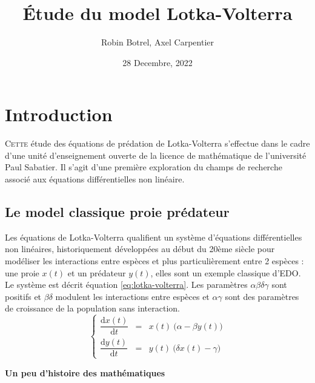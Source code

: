 \documentclass{wsdcr}
\title{Étude du model Lotka-Volterra}
\author{Robin Botrel, Axel Carpentier}
\affil{\textit{Université Paul Sabatier}\\
\textit{Toulouse, France}}
\date{28 Decembre, 2022}
\begin{document}
\maketitle
\tableofcontents
\section{Introduction}

\lettrine{C}{ette} étude des équations de prédation de Lotka-Volterra s'effectue dans le cadre d'une unité d'enseignement ouverte de la licence de mathématique de l'université Paul Sabatier. Il s'agit d'une première exploration du champs de recherche associé aux équations différentielles non linéaire.


\subsection{Le model classique proie prédateur}

Les équations de Lotka-Volterra qualifient un système d'équations différentielles non linéaires, historiquement développées au début du 20ème siècle pour modéliser les interactions entre espèces et plus particulièrement entre 2 espèces : une proie $x(t)$ et un prédateur $y(t)$, elles sont un exemple classique d'EDO. Le système est décrit équation \ref{eq:lotka-volterra}. Les paramètres $\alpha \beta \delta \gamma$ sont positifs et $\beta \delta$ modulent les interactions entre espèces et $\alpha \gamma$ sont des paramètres de croissance de la population sans interaction. \cite{lotka1920}
\begin{equation}
\left\{
{\begin{array}{ccc}{\dfrac {\mathrm {d} x(t)}{\mathrm {d} t}}&=&x(t)\ {\Big (}\alpha -\beta y(t){\Big )}\\{\dfrac {\mathrm {d} y(t)}{\mathrm {d} t}}&=&y(t)\ {\Big (}\delta x(t)-\gamma {\Big )}\end{array}}
\right.
\label{eq:lotka-volterra}
\end{equation}

\begin{center}
    \fontsize{10}{12}\selectfont
    \textbf{Un peu d'histoire des mathématiques}
\end{center}
\end{document}
